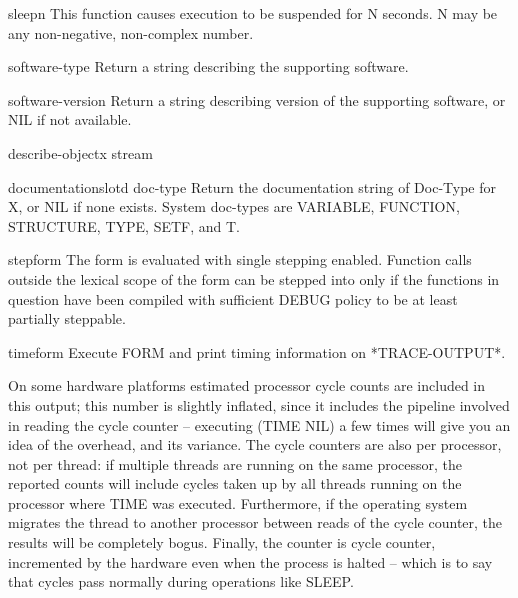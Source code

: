 \documentclass[10pt,english]{book}
\begin{document}
\begin{function}{sleep}{n}
  This function causes execution to be suspended for N seconds. N may
  be any non-negative, non-complex number.
\end{function}

\begin{function}{software-type}{}
  Return a string describing the supporting software.
\end{function}

\begin{function}{software-version}{}
  Return a string describing version of the supporting software, or NIL
  if not available.
\end{function}

\begin{generic}{describe-object}{x stream}
  
\end{generic}

\begin{generic}{documentation}{slotd doc-type}
  Return the documentation string of Doc-Type for X, or NIL if
  none exists. System doc-types are VARIABLE, FUNCTION, STRUCTURE, TYPE,
  SETF, and T.
\end{generic}

\begin{macro}{step}{form}
  The form is evaluated with single stepping enabled. Function calls
outside the lexical scope of the form can be stepped into only if the
functions in question have been compiled with sufficient DEBUG policy
to be at least partially steppable.
\end{macro}

\begin{macro}{time}{form}
  Execute FORM and print timing information on *TRACE-OUTPUT*.

On some hardware platforms estimated processor cycle counts are
included in this output; this number is slightly inflated, since it
includes the pipeline involved in reading the cycle counter --
executing (TIME NIL) a few times will give you an idea of the
overhead, and its variance. The cycle counters are also per processor,
not per thread: if multiple threads are running on the same processor,
the reported counts will include cycles taken up by all threads
running on the processor where TIME was executed. Furthermore, if the
operating system migrates the thread to another processor between
reads of the cycle counter, the results will be completely bogus.
Finally, the counter is cycle counter, incremented by the hardware
even when the process is halted -- which is to say that cycles pass
normally during operations like SLEEP.
\end{macro}
\end{document}
